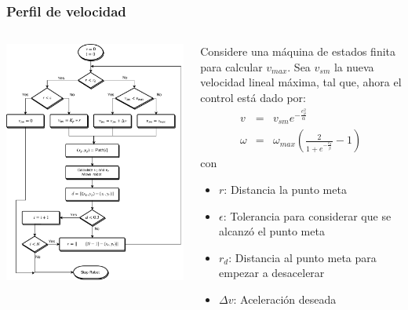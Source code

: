 \begin{frame}\frametitle{Perfil de velocidad}
  \begin{columns}
    \begin{column}{0.43\textwidth}
      \includegraphics[width=\textwidth]{Figures/MotionPlanning/AFSM.pdf}
    \end{column}
    \begin{column}{0.5\textwidth}
      Considere una máquina de estados finita para calcular $v_{max}$. Sea $v_{sm}$ la nueva velocidad lineal máxima, tal que, ahora el control está dado por:
      \begin{eqnarray*}
        v      &=& v_{sm}e^{-\frac{e_{\theta}^{2}}{\alpha}}\label{eq:NewControl1}\\
        \omega &=& \omega_{max}\left(\frac{2}{1+e^{-\frac{e_{\theta}}{\beta}}}-1\right)\label{eq:NewControl2}
      \end{eqnarray*}
      con
      \begin{itemize}
      \item $r$: Distancia la punto meta
      \item $\epsilon$: Tolerancia para considerar que se alcanzó el punto meta
      \item $r_d$: Distancia al punto meta para empezar a desacelerar
      \item $\Delta v$: Aceleración deseada
      \end{itemize}
    \end{column}
  \end{columns}
\end{frame}

